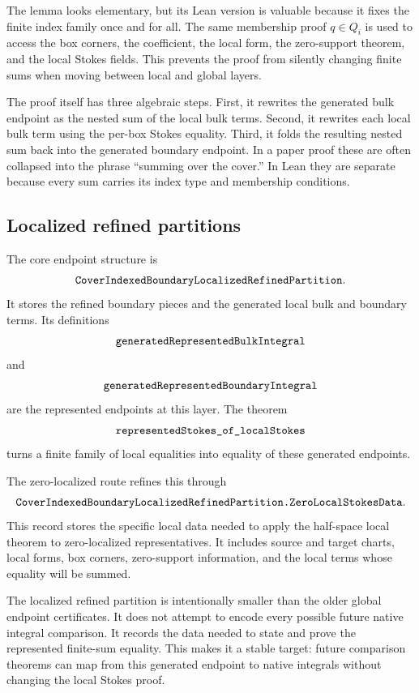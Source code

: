 The lemma looks elementary, but its Lean version is valuable because it fixes
the finite index family once and for all.  The same membership proof
\(q\in Q_i\) is used to access the box corners, the coefficient, the local
form, the zero-support theorem, and the local Stokes fields.  This prevents
the proof from silently changing finite sums when moving between local and
global layers.

The proof itself has three algebraic steps.  First, it rewrites the generated
bulk endpoint as the nested sum of the local bulk terms.  Second, it rewrites
each local bulk term using the per-box Stokes equality.  Third, it folds the
resulting nested sum back into the generated boundary endpoint.  In a paper
proof these are often collapsed into the phrase ``summing over the cover.''
In Lean they are separate because every sum carries its index type and
membership conditions.

\subsection{Localized refined partitions}

The core endpoint structure is
\[
\code{CoverIndexedBoundaryLocalizedRefinedPartition}.
\]
It stores the refined boundary pieces and the generated local bulk and
boundary terms.  Its definitions
\[
\code{generatedRepresentedBulkIntegral}
\]
and
\[
\code{generatedRepresentedBoundaryIntegral}
\]
are the represented endpoints at this layer.  The theorem
\[
\code{representedStokes_of_localStokes}
\]
turns a finite family of local equalities into equality of these generated
endpoints.

The zero-localized route refines this through
\[
\code{CoverIndexedBoundaryLocalizedRefinedPartition.ZeroLocalStokesData}.
\]
This record stores the specific local data needed to apply the half-space
local theorem to zero-localized representatives.  It includes source and
target charts, local forms, box corners, zero-support information, and the
local terms whose equality will be summed.

The localized refined partition is intentionally smaller than the older global
endpoint certificates.  It does not attempt to encode every possible future
native integral comparison.  It records the data needed to state and prove the
represented finite-sum equality.  This makes it a stable target: future
comparison theorems can map from this generated endpoint to native integrals
without changing the local Stokes proof.

